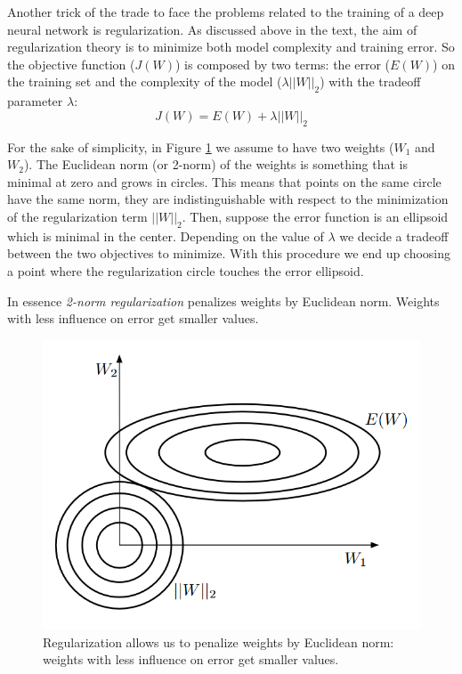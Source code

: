 Another trick of the trade to face the problems related to the training of a deep
neural network is regularization. As discussed above in the text, the aim of regularization
theory is to minimize both model complexity and training error. So the objective
function ($J(W)$) is composed by two terms: the error ($E(W)$) on the training set
and the complexity of the model ($\lambda ||W||_{2}$) with the tradeoff parameter
$\lambda$:
\[
	J(W) = E(W)+\lambda ||W||_{2}
\]

For the sake of simplicity, in Figure \ref{fig:deep_regularization} we assume to
have two weights ($W_{1}$ and $W_{2}$). The Euclidean norm (or 2-norm) of the weights
is something that is minimal at zero and grows in circles. This means that
points on the same circle have the same norm, they are indistinguishable with respect
to the minimization of the regularization term $||W||_{2}$. Then, suppose the error
function is an ellipsoid which is minimal in the center. Depending on the value
of $\lambda$ we decide a tradeoff between the two objectives to minimize. With this
procedure we end up choosing a point where the regularization circle touches the
error ellipsoid.
\newline

In essence \textit{2-norm regularization} penalizes weights by Euclidean norm. Weights
with less influence on error get smaller values.
\newline

\begin{figure}[H]
	\centering
	\includegraphics[scale=0.5]{
        images/16_DeepLearning_2Norm.png
    }
	\caption{Regularization allows us to penalize weights by Euclidean norm: weights
	with less influence on error get smaller values.}
	\label{fig:deep_regularization}
\end{figure}

